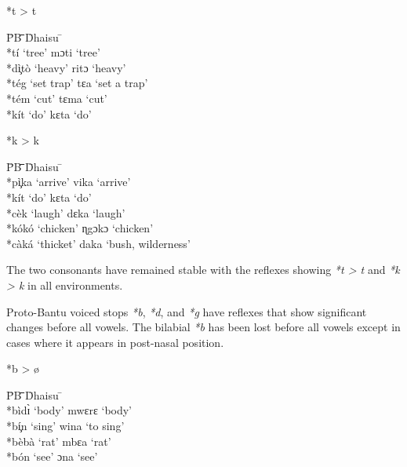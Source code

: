 \documentclass[output=paper,colorlinks,citecolor=brown]{langscibook}
\begin{document}
\ea%
    \label{ex:ngonyani:4}
    *t > t\\
    \begin{tabbing} 
        \= PB \quad\= \quad\= \quad\= \quad\= \quad\= \quad\= \quad\= Dhaisu \quad\=  \quad\= \\
        \>  *tí\>  ‘tree’ \> \> \>  \> \> \>  mɔti \>  ‘tree’\\
        \> *dì̧tò\> ‘heavy’ \> \> \>  \> \> \>  ritɔ \>  ‘heavy’\\
        \>  *tég \> ‘set trap’ \> \> \>  \> \> \>  tɛa \>  ‘set a trap’\\
        \>  *tém \>  ‘cut’ \> \> \>  \> \> \>  tɛma \>  ‘cut’ \\
        \> *kít \> ‘do’ \> \> \>  \> \> \> kɛta \> ‘do’    
    \end{tabbing}
\z

\ea%
    \label{ex:ngonyani:5}
    *k > k\\
    \begin{tabbing} 
        \= PB \quad\= \quad\= \quad\= \quad\= \quad\= \quad\= \quad\= Dhaisu \quad\=  \quad\= \\
        \> *pì̧ka \> ‘arrive’ \> \> \>  \> \> \> vika \> ‘arrive’\\
        \> *kít \> ‘do’ \> \> \>  \> \> \> kɛta \> ‘do’\\
        \> *cèk \> ‘laugh’ \> \> \>  \> \> \> dɛka \> ‘laugh’\\
        \> *kókó \> ‘chicken’ \> \> \>  \> \> \> ɳgɔkɔ \> ‘chicken’\\
        \> *càká \> ‘thicket’\> \> \>  \> \> \> daka \> ‘bush, wilderness’
    \end{tabbing}
\z

The two consonants have remained stable with the reflexes showing \textit{*t > t }and \textit{*k > k } in  all  environments.

Proto-Bantu voiced stops \textit{*b}, \textit{*d}, and \textit{*g} have reflexes that show significant changes before all vowels. The bilabial \textit{*b} has been lost before all vowels except in cases where it appears in post-nasal position.

\ea%
    \label{ex:ngonyani:6}
    *b > ø\\
    \begin{tabbing} 
        \= PB \quad\= \quad\= \quad\= \quad\= \quad\= \quad\= \quad\= Dhaisu \quad\=  \quad\= \\
        \> *bìdɪ̀
        \> ‘body’
        \> \> \>  \> \> \> mwɛrɛ
        \> ‘body’\\
        \> *bí̧n
        \> ‘sing’
        \> \> \>  \> \> \> wina
        \> ‘to sing’\\
        \> *bèbà
        \> ‘rat’
        \> \> \>  \> \> \> mbɛa
        \> ‘rat’\\
        \> *bón
        \> ‘see’
        \> \> \>  \> \> \>  ɔna
        \> ‘see’
    \end{tabbing}
\z
\end{document}
